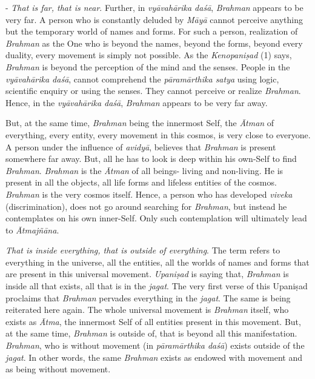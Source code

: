 - \emph{That is far, that is near}. Further, in \emph{vyāvahārika daśā}, \emph{Brahman} appears to be very far. A person who is constantly deluded by \emph{Māyā} cannot perceive anything but the temporary world of names and forms. For such a person, realization of \emph{Brahman} as the One who is beyond the names, beyond the forms, beyond every duality, every movement is simply not possible. As the \emph{Kenopaniṣad} (1) says, \emph{Brahman} is beyond the perception of the mind and the senses. People in the \emph{vyāvahārika daśā}, cannot comprehend the \emph{pāramārthika satya} using logic, scientific enquiry or using the senses. They cannot perceive or realize \emph{Brahman}. Hence, in the \emph{vyāvahārika daśā}, \emph{Brahman} appears to be very far away.

But, at the same time, \emph{Brahman} being the innermost Self, the \emph{Ātman} of everything, every entity, every movement in this cosmos, is very close to everyone. A person under the influence of \emph{avidyā}, believes that \emph{Brahman} is present somewhere far away. But, all he has to look is deep within his own-Self to find \emph{Brahman}. \emph{Brahman} is the \emph{Ātman} of all beings- living and non-living. He is present in all the objects, all life forms and lifeless entities of the cosmos. \emph{Brahman} is the very cosmos itself. Hence, a person who has developed \emph{viveka} (discrimination), does not go around searching for \emph{Brahman}, but instead he contemplates on his own inner-Self. Only such contemplation will ultimately lead to \emph{Ātmajñāna}.

 \emph{That is inside everything, that is outside of everything}. The term  refers to everything in the universe, all the entities, all the worlds of names and forms that are present in this universal movement. \emph{Upaniṣad} is saying that, \emph{Brahman} is inside all that exists, all that is in the \emph{jagat}. The very first verse of this Upaniṣad proclaims that \emph{Brahman} pervades everything in the \emph{jagat}. The same is being reiterated here again. The whole universal movement is \emph{Brahman} itself, who exists as \emph{Ātma}, the innermost Self of all entities present in this movement. But, at the same time, \emph{Brahman} is outside of, that is beyond all this manifestation. \emph{Brahman}, who is without movement (in \emph{pāramārthika daśā}) exists outside of the \emph{jagat}. In other words, the same \emph{Brahman} exists as endowed with movement and as being without movement.

